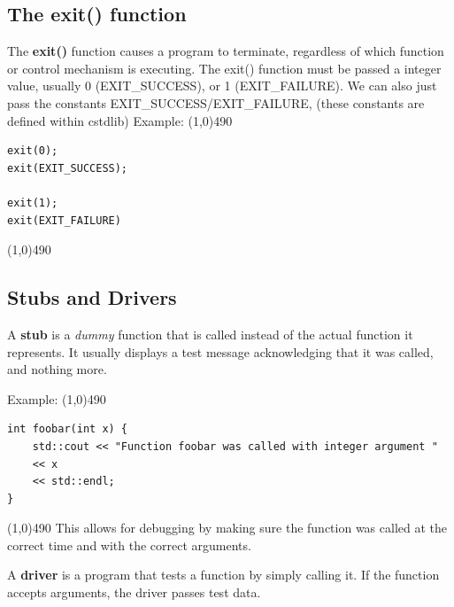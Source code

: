 \documentclass{report}
\begin{document}
    \subsection{The exit() function}
    \bigbreak \noindent 
    \begin{concept}

	\end{concept}
    \bigbreak \noindent 
    The \textbf{exit()} function causes a program to terminate, regardless of which function or control mechanism is executing.
    \bigbreak \noindent 
    \bigbreak \noindent 
    The exit() function must be passed a integer value, usually 0 (EXIT\_SUCCESS), or 1 (EXIT\_FAILURE). We can also just pass the constants EXIT\_SUCCESS/EXIT\_FAILURE, (these constants are defined within cstdlib)
    Example:
    \bigbreak \noindent 
    \line(1,0){490}
    \begin{verbatim}
exit(0);
exit(EXIT_SUCCESS);

exit(1);
exit(EXIT_FAILURE)
    \end{verbatim}
    \line(1,0){490}

    \pagebreak \bigbreak \noindent 
    \subsection{Stubs and Drivers}
    \bigbreak \noindent 
    \begin{concept}
 A \textbf{stub} is a \textit{dummy} function that is called instead of the actual function it represents. It usually displays a test message acknowledging that it was called, and nothing more.
	\end{concept}
    \bigbreak \noindent 
    Example:
    \bigbreak \noindent 
    \line(1,0){490}
    \begin{verbatim}
int foobar(int x) {
    std::cout << "Function foobar was called with integer argument " 
    << x 
    << std::endl;
}
    \end{verbatim}
    \line(1,0){490}
    \bigbreak \noindent 
    This allows for debugging by making sure the function was called at the correct time and with the correct arguments.
    \bigbreak \noindent 
    \begin{concept}
 A \textbf{driver} is a program that tests a function by simply calling it. If the function accepts arguments, the driver passes test data.
	\end{concept}

    \pagebreak \bigbreak \noindent 
\end{document}
